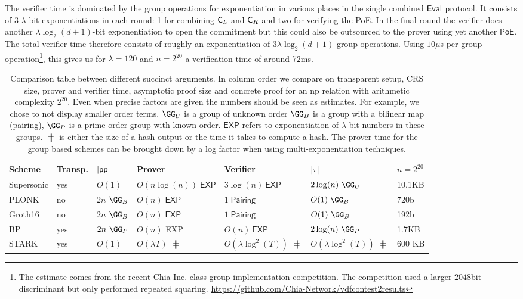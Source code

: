 The verifier time is dominated by the group operations for exponentiation in various places in the single combined $\textsf{{Eval}}$ protocol. It consists of 3 $\lambda$-bit exponentiations in each round: 1 for combining $\mathsf{C}_L$ and $\mathsf{C}_R$ and two for verifying the \textsf{PoE}. In the final round the verifier does another $\lambda \log_2(d+1)$-bit exponentiation to open the commitment but this could also be outsourced to the prover using yet another $\textsf{PoE}$. The total verifier time therefore consists of roughly an exponentiation of $3 \lambda \log_2(d+1)$ group operations. 
Using $10\mu$s per group operation\footnote{The estimate comes from the recent Chia Inc. class group implementation competition. The competition used a larger $2048$bit discriminant but only performed repeated squaring. \url{https://github.com/Chia-Network/vdfcontest2results}}, this gives us for $\lambda=120$ and $n=2^{20}$ a verification time of around 72ms. 
\begin{table}[!htp]
\begin{small}
\begin{tabular}{l||l|l|l|l|l|l}
	Scheme & Transp. & $|\textsf{pp}|$  & Prover & Verifier & $|\pi|$& $n=2^{20}$ \\
	\hline
	\hline
    \textsf{Supersonic} & yes & $O(1)$ & $O( n \log(n) )\; \textsf{EXP}$ & $3 \log(n)~\textsf{EXP}$ & $2 \log(n) \ \GG_{U}$ & 10.1KB \\
    \textsf{PLONK} \cite{Plonk} & no & $2n$ $\GG_{B}$ & $O(n)\; \textsf{EXP}$  & $1\; \textsf{Pairing} $ & $O(1)\; \GG_{B}$ & 720b \\
        Groth16 \cite{EC:Groth16} & no & $2n$ $\GG_{B}$ & $O(n)\; \textsf{EXP}$  & $1\; \textsf{Pairing} $ & $O(1) \ \GG_{B}$ & 192b \\
       BP \cite{SP:BBBPWM18} & yes &$2 n \ \GG_{P}$& $O(n)$ \textsf{EXP}& $O(n) \ \textsf{EXP}$ &$2 \log(n) \ \GG_P$ & 1.7KB\\
       \textsf{STARK} & yes & $O(1)$ & $O(\lambda  T)$ $\hash$ & $O(\lambda \log^2(T))$ $\hash$ & $O(\lambda \log^2(T))$ $\hash$ & 600 KB
\end{tabular}

\caption{Comparison table between different succinct arguments. 
In column order we compare on transparent setup, CRS size, prover and verifier time, asymptotic proof size and concrete proof for an np relation with arithmetic complexity $2^{20}$.
Even when precise factors are given the numbers should be seen as  estimates. For example, we chose to not display smaller order terms. $\GG_U$ is a group of unknown order $\GG_{B}$ is a group with a bilinear map (pairing), $\GG_{P}$ is a prime order group with known order. $\textsf{EXP}$ refers to exponentiation of $\lambda$-bit numbers in these groups. $\hash$ is either the size of a hash output or the time it takes to compute a hash. 
The prover time for the group based schemes can be brought down by a log factor when using multi-exponentiation techniques.}
\label{tab:proofcomp}
\end{small}
\end{table}

